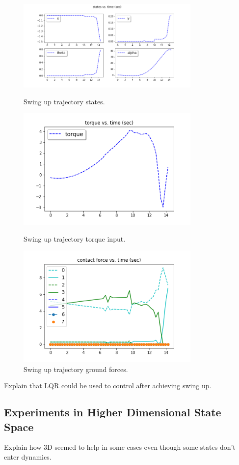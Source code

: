 \documentclass[conference]{IEEEtran}
\begin{document}
\begin{figure}[htbp]
\centerline{\includegraphics[width=9cm,keepaspectratio]{media/swing_up/swing_up_states.png}}
\caption{Swing up trajectory states.}
\label{fig:swing_states}
\centerline{\includegraphics[width=9cm,keepaspectratio]{media/swing_up/swing_up_torque.png}}
\caption{Swing up trajectory torque input.}
\label{fig:swing_input}
\centerline{\includegraphics[width=9cm,keepaspectratio]{media/swing_up/swing_up_ground_forces.png}}
\caption{Swing up trajectory ground forces.}
\label{fig:swing_ground}
\end{figure}

Explain that LQR could be used to control after achieving swing up.

\subsection{Experiments in Higher Dimensional State Space}
Explain how 3D seemed to help in some cases even though some states don't enter dynamics.
\end{document}

